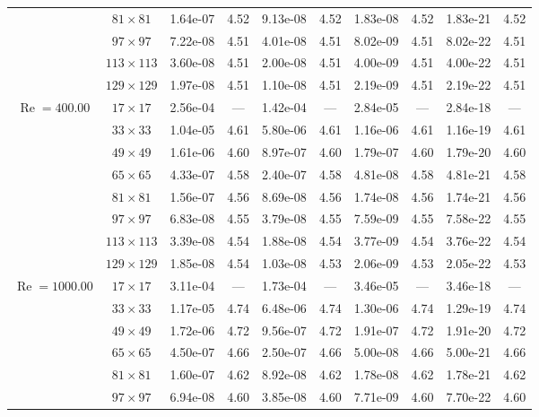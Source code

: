 \documentclass[preprint, 12pt]{elsarticle}
\begin{document}
{\begin{center}
\begin{table}[H]
{\begin{tabular*}{\textwidth}{@{\extracolsep\fill}cccccccccc@{}}
    & $81\times 81$ & 1.64e-07 & 4.52 & 9.13e-08 & 4.52 & 1.83e-08 & 4.52 & 1.83e-21 & 4.52 \\
    & $97\times 97$ & 7.22e-08 & 4.51 & 4.01e-08 & 4.51 & 8.02e-09 & 4.51 & 8.02e-22 & 4.51 \\
    & $113\times 113$ & 3.60e-08 & 4.51 & 2.00e-08 & 4.51 & 4.00e-09 & 4.51 & 4.00e-22 & 4.51 \\
    & $129\times 129$ & 1.97e-08 & 4.51 & 1.10e-08 & 4.51 & 2.19e-09 & 4.51 & 2.19e-22 & 4.51 \\
    \hline
    \multirow{7}{*}{$\operatorname{Re}=400.00$} & $17\times 17$ & 2.56e-04 & --- & 1.42e-04 & --- & 2.84e-05 & --- & 2.84e-18 & --- \\
    & $33\times 33$ & 1.04e-05 & 4.61 & 5.80e-06 & 4.61 & 1.16e-06 & 4.61 & 1.16e-19 & 4.61 \\
    & $49\times 49$ & 1.61e-06 & 4.60 & 8.97e-07 & 4.60 & 1.79e-07 & 4.60 & 1.79e-20 & 4.60 \\
    \multirow{3}{*}{$\operatorname{Wi}=5$} & $65\times 65$ & 4.33e-07 & 4.58 & 2.40e-07 & 4.58 & 4.81e-08 & 4.58 & 4.81e-21 & 4.58 \\
    & $81\times 81$ & 1.56e-07 & 4.56 & 8.69e-08 & 4.56 & 1.74e-08 & 4.56 & 1.74e-21 & 4.56 \\
    & $97\times 97$ & 6.83e-08 & 4.55 & 3.79e-08 & 4.55 & 7.59e-09 & 4.55 & 7.58e-22 & 4.55 \\
    & $113\times 113$ & 3.39e-08 & 4.54 & 1.88e-08 & 4.54 & 3.77e-09 & 4.54 & 3.76e-22 & 4.54 \\
    & $129\times 129$ & 1.85e-08 & 4.54 & 1.03e-08 & 4.53 & 2.06e-09 & 4.53 & 2.05e-22 & 4.53 \\
    \hline
    \multirow{7}{*}{$\operatorname{Re}=1000.00$} & $17\times 17$ & 3.11e-04 & --- & 1.73e-04 & --- & 3.46e-05 & --- & 3.46e-18 & --- \\
    & $33\times 33$ & 1.17e-05 & 4.74 & 6.48e-06 & 4.74 & 1.30e-06 & 4.74 & 1.29e-19 & 4.74 \\
    & $49\times 49$ & 1.72e-06 & 4.72 & 9.56e-07 & 4.72 & 1.91e-07 & 4.72 & 1.91e-20 & 4.72 \\
    \multirow{3}{*}{$\operatorname{Wi}=5$} & $65\times 65$ & 4.50e-07 & 4.66 & 2.50e-07 & 4.66 & 5.00e-08 & 4.66 & 5.00e-21 & 4.66 \\
    & $81\times 81$ & 1.60e-07 & 4.62 & 8.92e-08 & 4.62 & 1.78e-08 & 4.62 & 1.78e-21 & 4.62 \\
    & $97\times 97$ & 6.94e-08 & 4.60 & 3.85e-08 & 4.60 & 7.71e-09 & 4.60 & 7.70e-22 & 4.60 \\

\end{tabular*}}
\end{table}
\end{center}}
\end{document}
